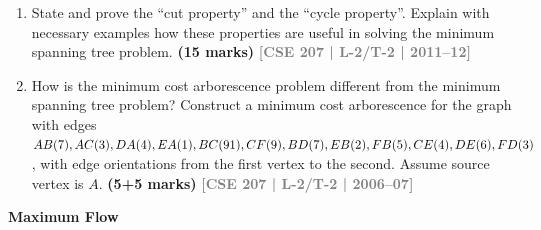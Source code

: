 \documentclass[12pt,a3paper]{article}
\newcommand{\yr}[1]{\hfill\textcolor{gray}{\small\textbf{[#1]}}}
\newcommand{\mk}[1]{\textcolor{orange!70!black}{\small\textbf{(#1 marks)}}}
\newcommand{\subtopic}[2]{%
  \vspace{10pt}
  \noindent\begin{tcolorbox}[colback=#1!8,colframe=#1,boxrule=0.6pt,arc=4pt,
    left=6pt,right=6pt,top=4pt,bottom=4pt]
    \small\bfseries\textcolor{#1}{#2}
  \end{tcolorbox}
  \vspace{2pt}
}
\begin{document}
\begin{enumerate}
\begin{center}
\end{center}

\item State and prove the ``cut property'' and the ``cycle property''. Explain with necessary examples how these properties are useful in solving the minimum spanning tree problem. \mk{15}
\yr{CSE 207 | L-2/T-2 | 2011--12}


\item How is the minimum cost arborescence problem different from the minimum spanning tree problem? Construct a minimum cost arborescence for the graph with edges $AB(7), AC(3), DA(4), EA(1), BC(91), CF(9), BD(7), EB(2), FB(5), CE(4), DE(6), \\FD(3)$, with edge orientations from the first vertex to the second. Assume source vertex is $A$. \mk{5+5}
\yr{CSE 207 | L-2/T-2 | 2006--07}

\end{enumerate}

\subtopic{cA}{Maximum Flow}
\label{sub:s1-maxflow}
\end{document}
